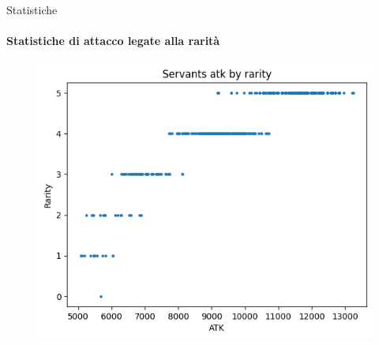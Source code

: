 \documentclass{beamer}
\begin{document}
\begin{darkframes}
  \begin{frame}{Statistiche}
    \framesubtitle{Statistiche di attacco legate alla rarità}
    \begin{figure}
      \centering
      \includegraphics[scale=0.6]{./images/class_and_stats_atk.png}
    \end{figure}
  \end{frame}


\end{darkframes}
\end{document}
